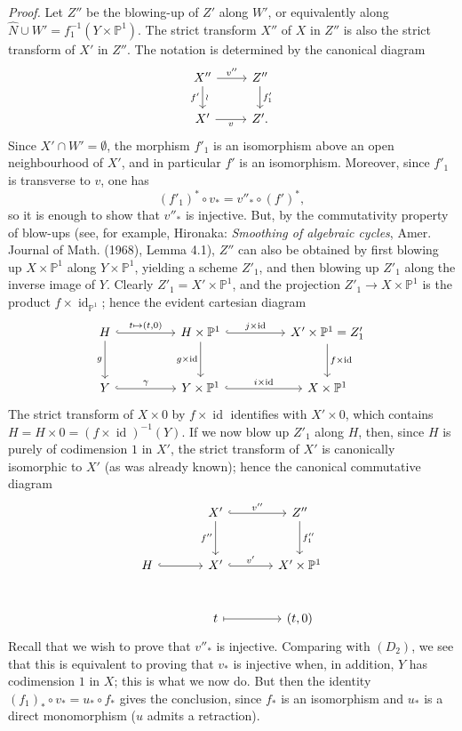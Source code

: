 \documentclass[11pt]{article}
\begin{document}
\emph{Proof.} Let $Z''$ be the blowing-up of $Z'$ along $W'$, or equivalently along $\widehat N\cup W'=f_1^{-1}(Y\times\mathbb P^1)$. The strict transform $X''$ of $X$ in $Z''$ is also the strict transform of $X'$ in $Z''$. The notation is determined by the canonical diagram
\[
\begin{tikzcd}
X''\arrow[r,"v''"]\arrow[d,"f'"',"\wr"]&Z''\arrow[d,"f'_1"]\\
X'\arrow[r,"v"']&Z'.
\end{tikzcd}
\]
Since $X'\cap W'=\emptyset$, the morphism $f'_1$ is an isomorphism above an open neighbourhood of $X'$, and in particular $f'$ is an isomorphism. Moreover, since $f'_1$ is transverse to $v$, one has
\[
(f'_1)^*\circ v_*=v''_*\circ(f')^*,
\tag{9.8.8}
\]
so it is enough to show that $v''_*$ is injective. But, by the commutativity property of blow-ups (see, for example, Hironaka: \emph{Smoothing of algebraic cycles}, Amer. Journal of Math. (1968), Lemma 4.1), $Z''$ can also be obtained by first blowing up $X\times\mathbb P^1$ along $Y\times\mathbb P^1$, yielding a scheme $Z'_1$, and then blowing up $Z'_1$ along the inverse image of $Y$. Clearly $Z'_1=X'\times\mathbb P^1$, and the projection $Z'_1\to X\times\mathbb P^1$ is the product $f\times\operatorname{id}_{\mathbb P^1}$; hence the evident cartesian diagram
\[
\begin{tikzcd}[column sep=huge,row sep=large]
H\arrow[r,hook,"{t\mapsto(t,0)}"]\arrow[d,"g"']&H\times\mathbb P^1\arrow[r,hook,"{j\times\operatorname{id}}"]\arrow[d,"{g\times\operatorname{id}}"']&X'\times\mathbb P^1=Z'_1\arrow[d,"{f\times\operatorname{id}}"]\\
Y\arrow[r,hook,"\gamma"]&Y\times\mathbb P^1\arrow[r,hook,"{i\times\operatorname{id}}"]&X\times\mathbb P^1
\end{tikzcd}
\]
The strict transform of $X\times0$ by $f\times\operatorname{id}$ identifies with $X'\times0$, which contains $H=H\times0=(f\times\operatorname{id})^{-1}(Y)$. If we now blow up $Z'_1$ along $H$, then, since $H$ is purely of codimension $1$ in $X'$, the strict transform of $X'$ is canonically isomorphic to $X'$ (as was already known); hence the canonical commutative diagram
\[
\begin{tikzcd}[column sep=large,row sep=large]
&X'\arrow[r,hook,"v''"]\arrow[d,"f''"']&Z''\arrow[d,"f''_1"]\\
H\arrow[r,hook]&X'\arrow[r,hook,"v'"]&X'\times\mathbb P^1\\
&t\arrow[r,mapsto]&{(t,0)}
\end{tikzcd}
\]
Recall that we wish to prove that $v''_*$ is injective. Comparing with $(D_2)$, we see that this is equivalent to proving that $v_*$ is injective when, in addition, $Y$ has codimension $1$ in $X$; this is what we now do. But then the identity $(f_1)_*\circ v_*=u_*\circ f_*$ gives the conclusion, since $f_*$ is an isomorphism and $u_*$ is a direct monomorphism ($u$ admits a retraction).
\end{document}
